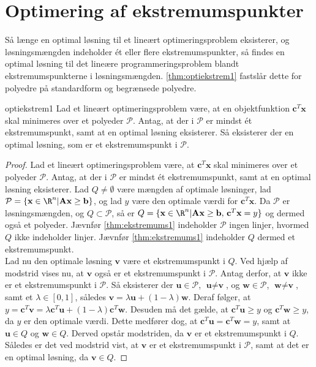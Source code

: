 \section{Optimering af ekstremumspunkter}
\label{klogskab}
%
Så længe en optimal løsning til et lineært optimeringsproblem eksisterer, og løsningsmængden indeholder ét eller flere ekstremumspunkter, så findes en optimal løsning til det lineære programmeringsproblem blandt ekstremumspunkterne i løsningsmængden. 
\ref{thm:optiekstrem1} fastslår dette for polyedre på standardform og begrænsede polyedre. 
%
\begin{thm}{}{optiekstrem1}
Lad et lineært optimeringsproblem være, at en objektfunktion $\textbf{c}^T \textbf{x}$ skal minimeres over et polyeder $\mathcal{P}$. 
Antag, at der i $\mathcal{P}$ er mindst ét ekstremumspunkt, samt at en optimal løsning eksisterer. 
Så eksisterer der en optimal løsning, som er et ekstremumspunkt i $\mathcal{P}$.
\end{thm}
%
\begin{proof}
Lad et lineært optimeringsproblem være, at $\textbf{c}^T \textbf{x}$ skal minimeres over et polyeder $\mathcal{P}$. 
Antag, at der i $\mathcal{P}$ er mindst ét ekstremumspunkt, samt at en optimal løsning eksisterer. 
Lad $Q \neq \emptyset $ være mængden af optimale løsninger, lad $\mathcal{P} = \{\textbf{x} \in \R^n | \textbf{A}\textbf{x} \geq \textbf{b} \}$, og lad $y$ være den optimale værdi for $\textbf{c}^T \textbf{x}$. 
Da $\mathcal{P}$ er løsningsmængden, og $Q \subset \mathcal{P}$, så er $Q = \{\textbf{x} \in \R^n | \textbf{A}\textbf{x} \geq \textbf{b} \text{, } \textbf{c}^T \textbf{x} = y \}$ og dermed også et polyeder. 
Jævnfør \ref{thm:ekstremums1} indeholder $\mathcal{P}$ ingen linjer, hvormed $Q$ ikke indeholder linjer. 
Jævnfør \ref{thm:ekstremums1} indeholder $Q$ dermed et ekstremumspunkt. \\
Lad nu den optimale løsning $\textbf{v}$ være et ekstremumspunkt i $Q$. 
Ved hjælp af modstrid vises nu, at $\textbf{v}$ også er et ekstremumspunkt i $\mathcal{P}$. 
Antag derfor, at $\textbf{v}$ ikke er et ekstremumspunkt i $\mathcal{P}$. 
Så eksisterer der $\textbf{u} \in \mathcal{P}$, $\textbf{u} \neq \textbf{v}$, og $\textbf{w} \in \mathcal{P}$, $\textbf{w} \neq \textbf{v}$, samt et $\lambda \in [0,1]$, således $ \textbf{v} = \lambda \textbf{u} + (1 - \lambda) \textbf{w}$. 
Deraf følger, at $y = \textbf{c}^T \textbf{v} =  \lambda \textbf{c}^T \textbf{u} + (1 - \lambda) \textbf{c}^T \textbf{w}$. 
Desuden må det gælde, at $\textbf{c}^T \textbf{u} \geq y$ og $\textbf{c}^T \textbf{w} \geq y$, da $y$ er den optimale værdi. 
Dette medfører dog, at $ \textbf{c}^T \textbf{u} = \textbf{c}^T \textbf{w} = y$, samt at $\textbf{u} \in Q$ og $\textbf{w} \in Q$. 
Derved opstår modstriden, da $\textbf{v}$ er et ekstremumspunkt i $Q$. 
Således er det ved modstrid vist, at $\textbf{v}$ er et ekstremumspunkt i $\mathcal{P}$, samt at det er en optimal løsning, da $\textbf{v} \in Q$. 
\end{proof}\\
